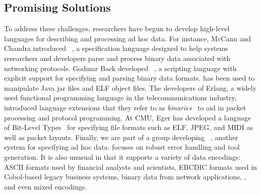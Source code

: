 \subsection{Promising Solutions}

To address these challenges, 
researchers have begun to develop high-level languages 
for describing and processing ad hoc data.  For instance,
McCann and Chandra introduced
\packettypes{}~\cite{sigcomm00}, a specification language designed to help systems
researchers and developers parse and process binary data 
associated with networking protocols.
Godmar Back
developed \datascript{}~\cite{gpce02}, a scripting language with explicit support for 
specifying and parsing binary data formats. \datascript{} has been 
used to manipulate Java jar files and ELF object files.
The developers of Erlang,
a widely used functional programming language in the 
telecommunications industry, introduced 
language extensions that they refer to as {\em binaries}~\cite{erlang-bits}
to aid in packet processing and protocol programming.
At CMU, Eger has developed a language of Bit-Level Types~\cite{eger:blt}
for specifying file formats such as ELF, JPEG, and
MIDI as well as packet layouts.  Finally, we are part of a group developing
\pads{}~\cite{fisher+:pads}, another system for specifying ad hoc data.
\pads{} focuses on robust error handling and tool generation.
It is also unusual in that it supports a variety of data encodings:
ASCII formats used by financial analysts and scientists,
EBCDIC formats used in Cobol-based legacy business systems,
binary data from network applications, \etc{}, 
and even mixed encodings.



